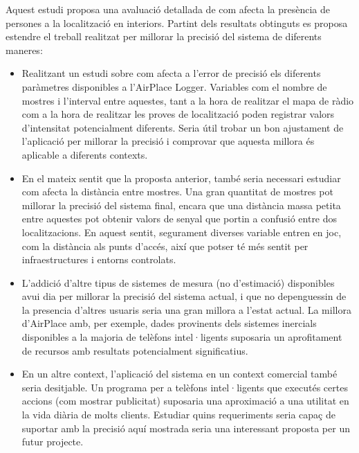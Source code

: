 
Aquest estudi proposa una avaluació detallada de com afecta la presència de persones a la localització en interiors. Partint dels resultats obtinguts es proposa estendre el treball realitzat per millorar la precisió del sistema de diferents maneres:

\begin{itemize}
    \item Realitzant un estudi sobre com afecta a l'error de precisió els diferents paràmetres disponibles a l'AirPlace Logger. Variables com el nombre de mostres i l'interval entre aquestes, tant a la hora de realitzar el mapa de ràdio com a la hora de realitzar les proves de localització poden registrar valors d'intensitat potencialment diferents. Seria útil trobar un bon ajustament de l'aplicació per millorar la precisió i comprovar que aquesta millora és aplicable a diferents contexts.
    \item En el mateix sentit que la proposta anterior, també seria necessari estudiar com afecta la distància entre mostres. Una gran quantitat de mostres pot millorar la precisió del sistema final, encara que una distància massa petita entre aquestes pot obtenir valors de senyal que portin a confusió entre dos localitzacions. En aquest sentit, segurament diverses variable entren en joc, com la distància als punts d'accés, així que potser té més sentit per infraestructures i entorns controlats.
    \item L'addició d'altre tipus de sistemes de mesura (no d'estimació) disponibles avui dia per millorar la precisió del sistema actual, i que no depenguessin de la presencia d'altres usuaris seria una gran millora a l'estat actual. La millora d'AirPlace amb, per exemple, dades provinents dels sistemes inercials disponibles a la majoria de telèfons intel·ligents suposaria un aprofitament de recursos amb resultats potencialment significatius.
    \item En un altre context, l'aplicació del sistema en un context comercial també seria desitjable. Un programa per a telèfons intel·ligents que executés certes accions (com mostrar publicitat) suposaria una aproximació a una utilitat en la vida diària de molts clients. Estudiar quins requeriments seria capaç de suportar amb la precisió aquí mostrada seria una interessant proposta per un futur projecte.
\end{itemize}
